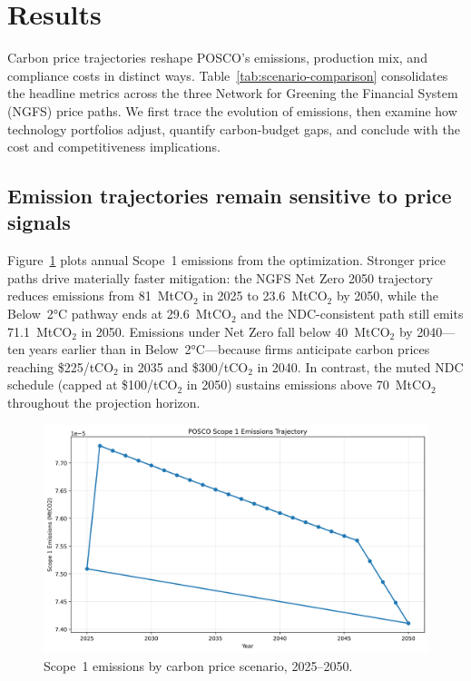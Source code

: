 \documentclass[preprint,1p,authoryear]{elsarticle}
\begin{document}
\section{Results}

Carbon price trajectories reshape POSCO's emissions, production mix, and compliance costs in distinct ways. Table~\ref{tab:scenario-comparison} consolidates the headline metrics across the three Network for Greening the Financial System (NGFS) price paths. We first trace the evolution of emissions, then examine how technology portfolios adjust, quantify carbon-budget gaps, and conclude with the cost and competitiveness implications.

\subsection{Emission trajectories remain sensitive to price signals}

Figure~\ref{fig:scope1-by-scenario} plots annual Scope~1 emissions from the optimization. Stronger price paths drive materially faster mitigation: the NGFS Net Zero 2050 trajectory reduces emissions from 81~MtCO$_2$ in 2025 to 23.6~MtCO$_2$ by 2050, while the Below~2°C pathway ends at 29.6~MtCO$_2$ and the NDC-consistent path still emits 71.1~MtCO$_2$ in 2050. Emissions under Net Zero fall below 40~MtCO$_2$ by 2040—ten years earlier than in Below~2°C—because firms anticipate carbon prices reaching \$225/tCO$_2$ in 2035 and \$300/tCO$_2$ in 2040. In contrast, the muted NDC schedule (capped at \$100/tCO$_2$ in 2050) sustains emissions above 70~MtCO$_2$ throughout the projection horizon.

\begin{figure}[!t]
  \centering
  \includegraphics[width=0.8\linewidth]{scope1_by_scenario}
  \caption{Scope~1 emissions by carbon price scenario, 2025--2050.}
  \label{fig:scope1-by-scenario}
\end{figure}
\end{document}
